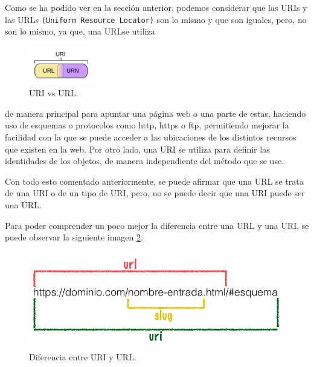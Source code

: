 \documentclass[11pt]{report}
\begin{document}
Como se ha podido ver en la sección anterior, podemos considerar que las URIs y las URLs \texttt{(Uniform Resource Locator)} son lo mismo y que son iguales, pero, no son lo mismo, ya que, una URLse utiliza 
\begin{figure}
	
	\includegraphics[width=0.25\textwidth]{../img/uri.png}
	\caption{URI vs URL.}
	\label{fig:Uri}
\end{figure}
de manera principal para apuntar una página web o una parte de estas, haciendo uso de esquemas o protocolos como http, https o ftp, permitiendo mejorar la facilidad con la que se puede acceder a las ubicaciones de los distintos recursos que existen en la web. Por otro lado, una URI se utiliza para definir las identidades de los objetos, de manera independiente del método que se use. 

Con todo esto comentado anteriormente, se puede afirmar que una URL se trata de una URI o de un tipo de URI, pero, no se puede decir que una URI puede ser una URL.

Para poder comprender un poco mejor la diferencia entre una URL y una URI, se puede observar la siguiente imagen \ref{fig:URI-URL}.

\begin{figure}[H]
	\centering
	\includegraphics[scale=0.6]{../img/diferencia-entre-url-y-uri.png}
	\caption{Diferencia entre URI y URL.}
	\label{fig:URI-URL}
\end{figure}

\end{document}
